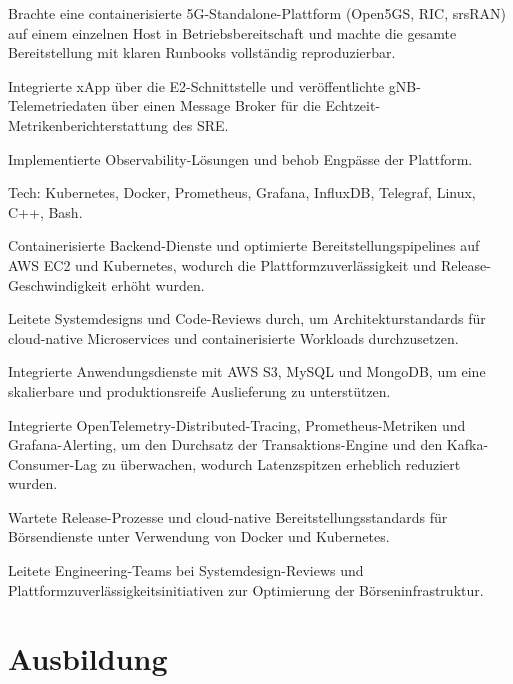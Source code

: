 \documentclass[10pt,a4paper]{resume}
\begin{document}
\bullets
  \item Brachte eine containerisierte 5G-Standalone-Plattform (Open5GS, RIC, srsRAN) auf einem einzelnen Host in Betriebsbereitschaft und machte die gesamte Bereitstellung mit klaren Runbooks vollständig reproduzierbar.
  \item Integrierte xApp über die E2-Schnittstelle und veröffentlichte gNB-Telemetriedaten über einen Message Broker für die Echtzeit-Metrikenberichterstattung des SRE.
  \item Implementierte Observability-Lösungen und behob Engpässe der Plattform.
  \item Tech: Kubernetes, Docker, Prometheus, Grafana, InfluxDB, Telegraf, Linux, C++, Bash.
\bulletsend
\vspace{1.5pt}
\bullets
  \item Containerisierte Backend-Dienste und optimierte Bereitstellungspipelines auf AWS EC2 und Kubernetes, wodurch die Plattformzuverlässigkeit und Release-Geschwindigkeit erhöht wurden.
  \item Leitete Systemdesigns und Code-Reviews durch, um Architekturstandards für cloud-native Microservices und containerisierte Workloads durchzusetzen.
  \item Integrierte Anwendungsdienste mit AWS S3, MySQL und MongoDB, um eine skalierbare und produktionsreife Auslieferung zu unterstützen.
\bulletsend
\vspace{1.5pt}
\bullets
  \item Integrierte OpenTelemetry-Distributed-Tracing, Prometheus-Metriken und Grafana-Alerting, um den Durchsatz der Transaktions-Engine und den Kafka-Consumer-Lag zu überwachen, wodurch Latenzspitzen erheblich reduziert wurden.
  \item Wartete Release-Prozesse und cloud-native Bereitstellungsstandards für Börsendienste unter Verwendung von Docker und Kubernetes.
  \item Leitete Engineering-Teams bei Systemdesign-Reviews und Plattformzuverlässigkeitsinitiativen zur Optimierung der Börseninfrastruktur.
\bulletsend
\vspace{1.5pt}

\section{Ausbildung}
\end{document}
